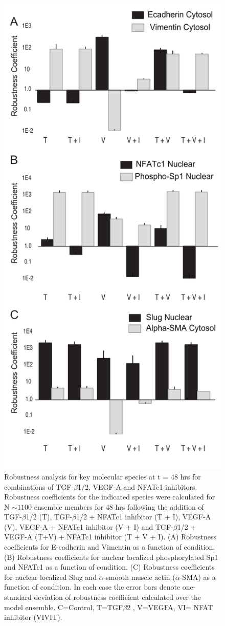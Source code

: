 \begin{figure}
\includegraphics [width=0.5\linewidth] {./figs/Fig-2-Supplemental-Robustness.pdf}
\caption{Robustness analysis for key molecular species at t = 48 hrs for combinations of TGF-$\beta$1/2, VEGF-A and NFATc1 inhibitors. Robustness coefficients for the indicated species were calculated
for N $\sim{1100}$ ensemble members for 48 hrs following the addition of TGF-$\beta$1/2 (T), TGF-$\beta$1/2 + NFATc1 inhibitor (T + I), VEGF-A (V), VEGF-A + NFATc1 inhibitor (V + I) and TGF-$\beta$1/2 + VEGF-A (T+V) + NFATc1 inhibitor (T + V + I).
(A) Robustness coefficients for E-cadherin and Vimentin as a function of condition.
(B) Robustness coefficients for nuclear localized phosphorylated Sp1 and NFATc1 as a function of condition.
(C) Robustness coefficients for nuclear localized Slug and $\alpha$-smooth muscle actin ($\alpha$-SMA) as a function of condition.
In each case the error bars denote one-standard deviation of robustness coefficient calculated over the model ensemble.
C=Control, T=TGF$\beta$2 , V=VEGFA, VI= NFAT inhibitor (VIVIT).}\label{fg:S2}
\end{figure}

